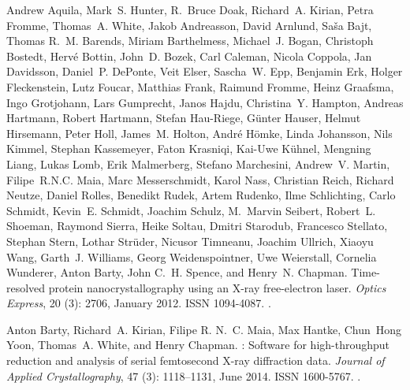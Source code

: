 \documentclass[a4paper]{article}
\begin{document}
\begin{thebibliography}{33}
Andrew Aquila, Mark~S. Hunter, R.~Bruce Doak, Richard~A. Kirian, Petra Fromme,
  Thomas~A. White, Jakob Andreasson, David Arnlund, Sa{\v s}a Bajt, Thomas
  R.~M. Barends, Miriam Barthelmess, Michael~J. Bogan, Christoph Bostedt,
  Herv{\'e} Bottin, John~D. Bozek, Carl Caleman, Nicola Coppola, Jan Davidsson,
  Daniel~P. DePonte, Veit Elser, Sascha~W. Epp, Benjamin Erk, Holger
  Fleckenstein, Lutz Foucar, Matthias Frank, Raimund Fromme, Heinz Graafsma,
  Ingo Grotjohann, Lars Gumprecht, Janos Hajdu, Christina~Y. Hampton, Andreas
  Hartmann, Robert Hartmann, Stefan {Hau-Riege}, G{\"u}nter Hauser, Helmut
  Hirsemann, Peter Holl, James~M. Holton, Andr{\'e} H{\"o}mke, Linda Johansson,
  Nils Kimmel, Stephan Kassemeyer, Faton Krasniqi, Kai-Uwe K{\"u}hnel, Mengning
  Liang, Lukas Lomb, Erik Malmerberg, Stefano Marchesini, Andrew~V. Martin,
  Filipe~R.N.C. Maia, Marc Messerschmidt, Karol Nass, Christian Reich, Richard
  Neutze, Daniel Rolles, Benedikt Rudek, Artem Rudenko, Ilme Schlichting, Carlo
  Schmidt, Kevin~E. Schmidt, Joachim Schulz, M.~Marvin Seibert, Robert~L.
  Shoeman, Raymond Sierra, Heike Soltau, Dmitri Starodub, Francesco Stellato,
  Stephan Stern, Lothar Str{\"u}der, Nicusor Timneanu, Joachim Ullrich, Xiaoyu
  Wang, Garth~J. Williams, Georg Weidenspointner, Uwe Weierstall, Cornelia
  Wunderer, Anton Barty, John C.~H. Spence, and Henry~N. Chapman.
\newblock Time-resolved protein nanocrystallography using an {{X-ray}}
  free-electron laser.
\newblock \emph{Optics Express}, 20 (3): 2706, January 2012.
\newblock ISSN 1094-4087.
\newblock {}.

Anton Barty, Richard~A. Kirian, Filipe R. N.~C. Maia, Max Hantke, Chun~Hong
  Yoon, Thomas~A. White, and Henry Chapman.
 : Software for high-throughput reduction and
  analysis of serial femtosecond {{X-ray}} diffraction data.
\newblock \emph{Journal of Applied Crystallography}, 47 (3):
  1118--1131, June 2014.
\newblock ISSN 1600-5767.
\newblock {}.


\end{thebibliography}
\end{document}
